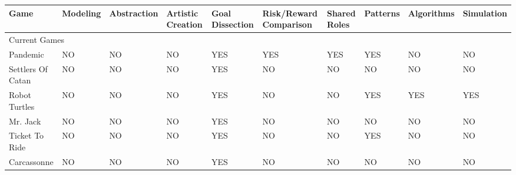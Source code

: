 \documentclass{acm_proc_article-sp}
\begin{document}
\clearpage
\begin{sidewaystable}[htbp]
    \vspace*{-9cm}\hspace*{-1cm}\begin{tabular}{|p{2cm}||p{1.5cm}|p{2.5cm}|p{2.5cm}|p{2.7cm}|p{2cm}|p{1.5cm}|p{2cm}|p{4.2cm}|p{1.5cm}|}
    
    \hline

    Game
    & Modeling
    & Abstraction
    & Artistic Creation
    & Goal Dissection
    & Risk/Reward Comparison
    & Shared Roles
    & Patterns
    & Algorithms
    & Simulation \\ \hline \hline
    
    \multicolumn{10}{|l|}{Current Games}  \\ \hline \hline
    
    Pandemic
      & NO
      & NO
      & NO 
      & \cellcolor{blue!25}YES 
      & \cellcolor{blue!25}YES 
      & \cellcolor{blue!25}YES 
      & \cellcolor{blue!25}YES 
      & NO 
      & NO \\ \hline
    
    Settlers Of Catan 
      & NO 
      & NO 
      & NO 
      & \cellcolor{blue!25}YES 
      & NO 
      & NO 
      & NO 
      & NO 
      & NO \\ \hline

    Robot Turtles 
      & NO 
      & NO 
      & NO 
      & \cellcolor{blue!25}YES 
      & NO 
      & NO 
      & \cellcolor{blue!25}YES 
      & \cellcolor{blue!25}YES 
      & \cellcolor{blue!25}YES \\ \hline

    Mr. Jack 
      & NO 
      & NO 
      & NO 
      & \cellcolor{blue!25}YES 
      & NO 
      & NO 
      & NO 
      & NO 
      & NO \\ \hline

    Ticket To Ride 
      & NO 
      & NO 
      & NO 
      & \cellcolor{blue!25}YES 
      & NO 
      & NO 
      & \cellcolor{blue!25}YES 
      & NO 
      & NO \\ \hline

    Carcassonne 
      & NO 
      & NO 
      & NO 
      & \cellcolor{blue!25}YES 
      & NO 
      & NO 
      & NO 
      & NO 
      & NO \\ \hline


\end{tabular}
\end{sidewaystable}
\end{document}
